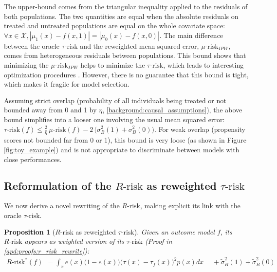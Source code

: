 \documentclass[french,12pt,twoside,a4paper]{book}
\newtheorem{proposition}{Proposition}
\begin{document}
The upper-bound comes from the triangular inequality applied to the residuals of
both populations. The two quantities are equal when the
absolute residuals on treated and untreated populations are equal on the
whole covariate space:
$\forall x \in \mathcal X, |\mu_1(x) - f(x, 1)| = |\mu_0(x) - f(x, 0)|$.
The main difference between the oracle $\tau \text{-risk}$ and the
reweighted mean squared error, $\mu\text{-risk}_{IPW}$, comes from heterogeneous
residuals between populations.
%
This bound shows that minimizing the $\mu\text{-risk}_{IPW}$ helps to
minimize the $\tau\text{-risk}$, which leads to
interesting optimization procedures \citep{johansson2022generalization}. However, there is no
guarantee that this bound is tight, which makes it fragile for model
selection.

Assuming strict overlap (probability of all individuals being treated or not
bounded away from 0 and 1 by $\eta$, \ref{background:causal_assumptions}), the
above bound simplifies into a looser one involving the usual mean squared error:
$\tau\text{-risk}(f)\leq \frac{2}{\eta}\, \mu\text{-risk}(f) -  2 \, \big(\sigma^2_{B}(1) +  \sigma^2_{B}(0)\big)$. For weak overlap (propensity scores not bounded far from 0
or 1), this bound is very loose (as shown in Figure \ref{fig:toy_example})
and is not appropriate to discriminate between models with close performances.


\subsection{Reformulation of the $R\text{-risk}$ as reweighted $\tau\text{-risk}$}%
\label{theory:r_risk_rewrite}%

We now derive a novel rewriting of the $R\text{-risk}$, making explicit its link
with the oracle $\tau \text{-risk}$.

\begin{proposition}[$R \text{-risk}$ as reweighted
    $\tau\text{-risk}$]\label{theory:prop:r_risk_rewrite} Given an outcome model
  $f$, its $R\text{-risk}$ appears as weighted version of its $\tau\text{-risk}$
  (Proof in \ref{apd:proofs:r_risk_rewrite}):
  \begin{align}
    R\text{-risk}^*(f) & = \int_{x} e(x)\big(1-e(x)\big)\big(\tau(x)-\tau_ {f}(x)\big)^{2} p(x) d x  \quad\; + \tilde{\sigma}_B^2(1) + \tilde{\sigma}_B^{2}(0)
  \end{align}
\end{proposition}
\end{document}
